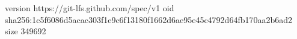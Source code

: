 version https://git-lfs.github.com/spec/v1
oid sha256:1c5f6086d5acac303f1e9c6f13180f1662d6ae95e45c4792d64fb170aa2b6ad2
size 349692
